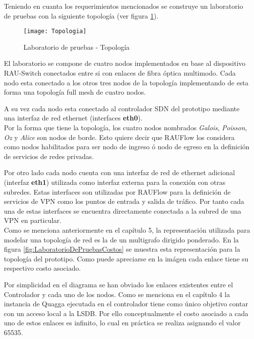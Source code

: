Teniendo en cuanta los requerimientos mencionados se construye un laboratorio de pruebas con la siguiente topolog\'ia (ver figura \ref{fig:LaboratorioDePruebasTopo}).
  
\begin{figure}[ht!] 
\centering    
\texttt{[image: Topologia]}
\caption[Laboratorio de pruebas - Topolog\'ia]{Laboratorio de pruebas - Topolog\'ia}
\label{fig:LaboratorioDePruebasTopo}
\end{figure}

El laboratorio se compone de cuatro nodos implementados en base al dispositivo RAU-Switch conectados entre si con enlaces de fibra \'optica multimodo. Cada nodo esta conectado a los otros tres nodos de la topolog\'ia implementando de esta forma una topolog\'ia full mesh de cuatro nodos.

A su vez cada nodo esta conectado al controlador SDN del prototipo mediante una interfaz de red ethernet (interfaces \textbf{eth0}).\\

Por la forma que tiene la topolog\'ia, los cuatro nodos nombrados \textit{Galois}, \textit{Poisson}, \textit{Oz} y \textit{Alice} son nodos de borde. Esto quiere decir que RAUFlow los considera como nodos habilitados para ser nodo de ingreso \'o nodo de egreso en la definici\'on de servicios de redes privadas.

Por otro lado cada nodo cuenta con una interfaz de red de ethernet adicional (interfaz \textbf{eth1}) utilizada como interfaz externa para la conexi\'on con otras subredes. Estas interfaces son utilizadas por RAUFlow para la definici\'on de servicios de VPN como los puntos de entrada y salida de tr\'afico. Por tanto cada una de estas interfaces se encuentra directamente conectada a la subred de una VPN en particular.\\  

Como se menciona anteriormente en el cap\'itulo 5, la representaci\'on utilizada para modelar una topolog\'ia de red es la de un multigrafo dirigido ponderado. En la figura \ref{fig:LaboratorioDePruebasCostos} se muestra esta representaci\'on para la topolog\'ia del prototipo. Como puede apreciarse en la im\'agen cada enlace tiene su respectivo costo asociado.

Por simplicidad en el diagrama se han obviado los enlaces existentes entre el Controlador y cada uno de los nodos. Como se menciona en el cap\'itulo 4 la instancia de Quagga ejecutada en el controlador tiene como \'unico objetivo contar con un acceso local a la LSDB. Por ello conceptualmente el costo asociado a cada uno de estos enlaces es infinito, lo cual en pr\'actica se realiza asignando el valor 65535.  

